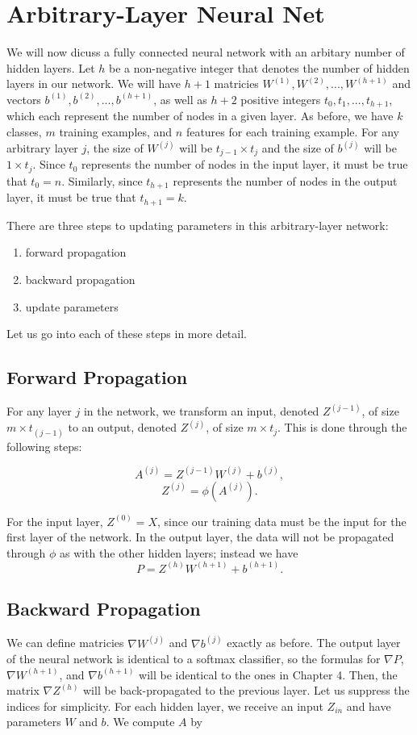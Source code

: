 \newpage
\section{Arbitrary-Layer Neural Net}
We will now dicuss a fully connected neural network with an arbitary number of
hidden layers. Let $h$ be a non-negative integer that denotes the number of
hidden layers in our network. We will have $h+1$ matricies $W^{(1)}, W^{(2)},
..., W^{(h+1)}$ and vectors $b^{(1)}, b^{(2)}, ..., b^{(h+1)}$, as well as
$h+2$ positive integers $t_0, t_1, ..., t_{h+1}$, which each represent the number
of nodes in a given layer. As before, we have $k$ classes, $m$ training
examples, and $n$ features for each training example. For any arbitrary layer
$j$, the size of $W^{(j)}$ will be $t_{j-1} \times t_j$ and the size of
$b^{(j)}$ will be $1 \times t_j$. Since $t_0$ represents the number of nodes in
the input layer, it must be true that $t_0 = n$. Similarly, since $t_{h+1}$
represents the number of nodes in the output layer, it must be true that
$t_{h+1} = k$.

There are three steps to updating parameters in this arbitrary-layer network:
\begin{enumerate}
\item forward propagation
\item backward propagation
\item update parameters
\end{enumerate}

Let us go into each of these steps in more detail.

\subsection{Forward Propagation}
For any layer $j$ in the network, we transform an input, denoted $Z^{(j-1)}$,
of size $m \times t_{(j-1)}$ to an output, denoted $Z^{(j)}$, of size $m \times
t_j$. This is done through the following steps:

$$ A^{(j)} = Z^{(j-1)} W^{(j)} + b^{(j)}, $$
$$ Z^{(j)} = \phi ( A^{(j)} ).$$

For the input layer, $Z^{(0)} = X$, since our training data must be the input
for the first layer of the network. In the output layer, the data will not be
propagated through $\phi$ as with the other hidden layers; instead we have
$$ P = Z^{(h)} W^{(h+1)} + b^{(h+1)}. $$


\subsection{Backward Propagation}
We can define matricies $\nabla W^{(j)}$ and $\nabla b^{(j)}$ exactly as
before. The output layer of the neural network is identical to a softmax
classifier, so the formulas for $\nabla P$, $\nabla W^{(h+1)}$, and $\nabla
b^{(h+1)}$ will be identical to the ones in Chapter 4.
Then, the matrix $\nabla Z^{(h)}$ will be back-propagated to the previous
layer. Let us suppress the indices for simplicity. For each hidden layer, we
receive an input $Z_{in}$ and have parameters $W$ and $b$. We compute $A$ by


